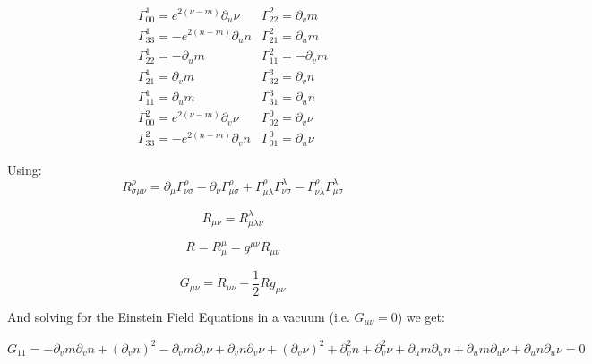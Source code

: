 \documentclass{article}
\begin{document}
\begin{center}
\begin{equation}
\begin{array}{cc}
\Gamma_{00}^{1}=e^{2(\nu-m)}\partial_{u}\nu & \Gamma_{22}^{2}=\partial_{v}m\\
\Gamma_{33}^{1}=-e^{2(n-m)}\partial_{u}n & \Gamma_{21}^{2}=\partial_{u}m\\
\Gamma_{22}^{1}=-\partial_{u}m & \Gamma_{11}^{2}=-\partial_{v}m\\
\Gamma_{21}^{1}=\partial_{v}m & \Gamma_{32}^{3}=\partial_{v}n\\
\Gamma_{11}^{1}=\partial_{u}m & \Gamma_{31}^{3}=\partial_{u}n\\
\Gamma_{00}^{2}=e^{2(\nu-m)}\partial_{v}\nu & \Gamma_{02}^{0}=\partial_{v}\nu\\
\Gamma_{33}^{2}=-e^{2(n-m)}\partial_{v}n & \Gamma_{01}^{0}=\partial_{u}\nu
\end{array}
\end{equation}
\end{center}

Using:
\begin{equation}
R_{\sigma\mu\nu}^{\rho}=\partial_{\mu}\Gamma_{\nu\sigma}^{\rho}-\partial_{\nu}\Gamma_{\mu\sigma}^{\rho}+\Gamma_{\mu\lambda}^{\rho}\Gamma_{\nu\sigma}^{\lambda}-\Gamma_{\nu\lambda}^{\rho}\Gamma_{\mu\sigma}^{\lambda}
\end{equation}

\begin{equation}
R_{\mu\nu}=R_{\mu\lambda\nu}^{\lambda}
\end{equation}


\begin{equation}
R=R_{\mu}^{\mu}=g^{\mu\nu}R_{\mu\nu}
\end{equation}


\begin{equation}
G_{\mu\nu}=R_{\mu\nu}-\frac{1}{2}Rg_{\mu\nu}
\end{equation}

And solving for the Einstein Field Equations in a vacuum (i.e. $G_{\mu\nu}=0$)
we get:

\begin{equation}
G_{11}=-\partial_{v}m\partial_{v}n+\left(\partial_{v}n\right)^{2}-\partial_{v}m\partial_{v}\nu+\partial_{v}n\partial_{v}\nu+\left(\partial_{v}\nu\right)^{2}+\partial_{v}^{2}n+\partial_{v}^{2}\nu+\partial_{u}m\partial_{u}n+\partial_{u}m\partial_{u}\nu+\partial_{u}n\partial_{u}\nu=0
\end{equation}
\end{document}
